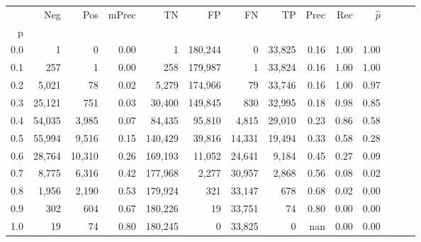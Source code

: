 \begin{tabular}{rrrrrrrrrrrrrr}
\toprule
{} &     Neg &     Pos & mPrec &       TN &       FP &      FN &      TP &  Prec &   Rec & $\hat{p}$ \\
p   &         &         &       &          &          &         &         &       &       &           \\
\midrule
0.0 &       1 &       0 &  0.00 &        1 &  180,244 &       0 &  33,825 &  0.16 &  1.00 &      1.00 \\
0.1 &     257 &       1 &  0.00 &      258 &  179,987 &       1 &  33,824 &  0.16 &  1.00 &      1.00 \\
0.2 &   5,021 &      78 &  0.02 &    5,279 &  174,966 &      79 &  33,746 &  0.16 &  1.00 &      0.97 \\
0.3 &  25,121 &     751 &  0.03 &   30,400 &  149,845 &     830 &  32,995 &  0.18 &  0.98 &      0.85 \\
0.4 &  54,035 &   3,985 &  0.07 &   84,435 &   95,810 &   4,815 &  29,010 &  0.23 &  0.86 &      0.58 \\
0.5 &  55,994 &   9,516 &  0.15 &  140,429 &   39,816 &  14,331 &  19,494 &  0.33 &  0.58 &      0.28 \\
0.6 &  28,764 &  10,310 &  0.26 &  169,193 &   11,052 &  24,641 &   9,184 &  0.45 &  0.27 &      0.09 \\
0.7 &   8,775 &   6,316 &  0.42 &  177,968 &    2,277 &  30,957 &   2,868 &  0.56 &  0.08 &      0.02 \\
0.8 &   1,956 &   2,190 &  0.53 &  179,924 &      321 &  33,147 &     678 &  0.68 &  0.02 &      0.00 \\
0.9 &     302 &     604 &  0.67 &  180,226 &       19 &  33,751 &      74 &  0.80 &  0.00 &      0.00 \\
1.0 &      19 &      74 &  0.80 &  180,245 &        0 &  33,825 &       0 &   nan &  0.00 &      0.00 \\
\bottomrule
\end{tabular}

